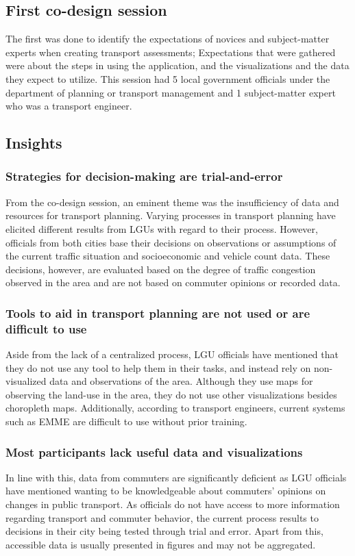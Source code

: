 \documentclass{sigchi}
\begin{document}
\subsection{First co-design session}
The first was done to identify the expectations of novices and subject-matter experts when creating transport assessments; Expectations that were gathered were about the steps in using the application, and the visualizations and the data they expect to utilize. This session had 5 local government officials under the department of planning or transport management and 1 subject-matter expert who was a transport engineer. 

\subsection{Insights}
\subsubsection{Strategies for decision-making are trial-and-error}
From the co-design session, an eminent theme was the insufficiency of data and resources for transport planning. Varying processes in transport planning have elicited different results from LGUs with regard to their process. However, officials from both cities base their decisions on observations or assumptions of the current traffic situation and socioeconomic and vehicle count data. These decisions, however, are evaluated based on the degree of traffic congestion observed in the area and are not based on commuter opinions or recorded data. 

\subsubsection{Tools to aid in transport planning are not used or are difficult to use}
Aside from the lack of a centralized process, LGU officials have mentioned that they do not use any tool to help them in their tasks, and instead rely on non-visualized data and observations of the area. Although they use maps for observing the land-use in the area, they do not use other visualizations besides choropleth maps. Additionally, according to transport engineers, current systems such as EMME are difficult to use without prior training.  

\subsubsection{Most participants lack useful data and visualizations}
In line with this, data from commuters are significantly deficient as LGU officials have mentioned wanting to be knowledgeable about commuters’ opinions on changes in public transport. As officials do not have access to more information regarding transport and commuter behavior, the current process results to decisions in their city being tested through trial and error. Apart from this, accessible data is usually presented in figures and may not be aggregated.
\end{document}
